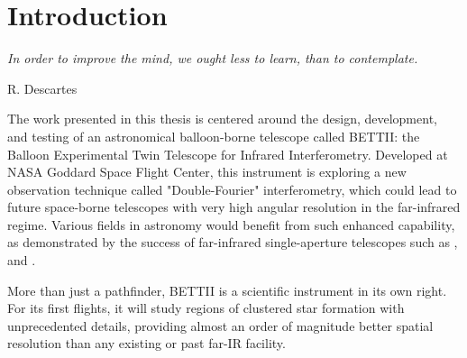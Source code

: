 \chapter*{Introduction}
\label{chap:introduction}


\epigraph{\small\itshape In order to improve the mind, we ought less to learn, than to contemplate.}{R. Descartes}


The work presented in this thesis is centered around the design, development, and testing of an astronomical balloon-borne telescope called BETTII: the Balloon Experimental Twin Telescope for Infrared Interferometry. Developed at NASA Goddard Space Flight Center, this instrument is exploring a new observation technique called "Double-Fourier" interferometry, which could lead to future space-borne telescopes with very high angular resolution in the far-infrared regime. Various fields in astronomy would benefit from such enhanced capability, as demonstrated by the success of far-infrared single-aperture telescopes such as \WISE, \Spitzer and \Herschel. 

More than just a pathfinder, BETTII is a scientific instrument in its own right. For its first flights, it will study regions of clustered star formation with unprecedented details, providing almost an order of magnitude better spatial resolution than any existing or past far-IR facility.

